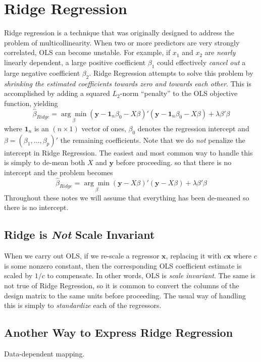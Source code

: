 \documentclass[12pt]{article}
\theoremstyle{definition}
\begin{document}
\section{Ridge Regression} 
Ridge regression is a technique that was originally designed to address the problem of multicollinearity. When two or more predictors are very strongly correlated, OLS can become unstable. For example, if $x_1$ and $x_2$ are \emph{nearly} linearly dependent, a large positive coefficient $\beta_1$ could effectively \emph{cancel out} a large negative coefficient $\beta_2$. Ridge Regression attempts to solve this problem by \emph{shrinking the estimated coefficients towards zero and towards each other}. This is accomplished by adding a squared $L_2$-norm ``penalty'' to the OLS objective function, yielding
	$$\widehat{\beta}_{Ridge} =\underset{\beta}{\arg \min} (\mathbf{y} - \textbf{1}_n\beta_0 - X\beta)' (\mathbf{y} - \textbf{1}_n \beta_0 - X\beta) + \lambda \beta'\beta$$
where $\textbf{1}_n$ is an $(n\times 1)$ vector of ones, $\beta_0$ denotes the regression intercept and $\beta = (\beta_1, \hdots, \beta_p)'$ the remaining coefficients. Note that we do \emph{not} penalize the intercept in Ridge Regression. The easiest and most common way to handle this is simply to de-mean both $X$ and $\mathbf{y}$ before proceeding. so that there is no intercept and the problem becomes
	$$\widehat{\beta}_{Ridge} =\underset{\beta}{\arg \min}(\mathbf{y} - X\beta)' (\mathbf{y} - X\beta) + \lambda \beta'\beta$$
Throughout these notes we will assume that everything has been de-meaned so there is no intercept.

\subsection{Ridge is \emph{Not} Scale Invariant} When we carry out OLS, if we re-scale a regressor $\mathbf{x}$, replacing it with $c \mathbf{x}$ where $c$ is some nonzero constant, then the corresponding OLS coefficient estimate is scaled by $1/c$ to compensate. In other words, OLS is \emph{scale invariant}. The same is not true of Ridge Regression, so it is common to convert the columns of the design matrix to the same units before proceeding. The usual way of handling this is simply to \emph{standardize} each of the regressors.

\subsection{Another Way to Express Ridge Regression}
Data-dependent mapping.
\end{document}
